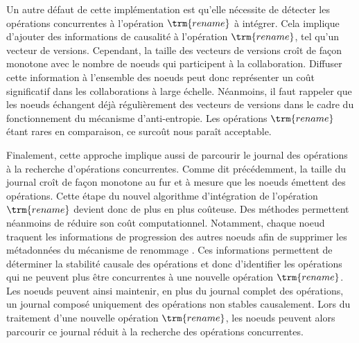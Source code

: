 Un autre défaut de cette implémentation est qu'elle nécessite de détecter les opérations concurrentes à l'opération $\trm{rename}$ à intégrer.
Cela implique d'ajouter des informations de causalité à l'opération $\trm{rename}$, tel qu'un vecteur de versions.
Cependant, la taille des vecteurs de versions croît de façon monotone avec le nombre de noeuds qui participent à la collaboration.
Diffuser cette information à l'ensemble des noeuds peut donc représenter un coût significatif dans les collaborations à large échelle.
Néanmoins, il faut rappeler que les noeuds échangent déjà régulièrement des vecteurs de versions dans le cadre du fonctionnement du mécanisme d'anti-entropie.
Les opérations $\trm{rename}$ étant rares en comparaison, ce surcoût nous paraît acceptable.

Finalement, cette approche implique aussi de parcourir le journal des opérations à la recherche d'opérations concurrentes.
Comme dit précédemment, la taille du journal croît de façon monotone au fur et à mesure que les noeuds émettent des opérations.
Cette étape du nouvel algorithme d'intégration de l'opération $\trm{rename}$ devient donc de plus en plus coûteuse.
Des méthodes permettent néanmoins de réduire son coût computationnel.
Notamment, chaque noeud traquent les informations de progression des autres noeuds afin de supprimer les métadonnées du mécanisme de renommage .
Ces informations permettent de déterminer la stabilité causale des opérations et donc d'identifier les opérations qui ne peuvent plus être concurrentes à une nouvelle opération $\trm{rename}$.
Les noeuds peuvent ainsi maintenir, en plus du journal complet des opérations, un journal composé uniquement des opérations non stables causalement.
Lors du traitement d'une nouvelle opération $\trm{rename}$, les noeuds peuvent alors parcourir ce journal réduit à la recherche des opérations concurrentes.
